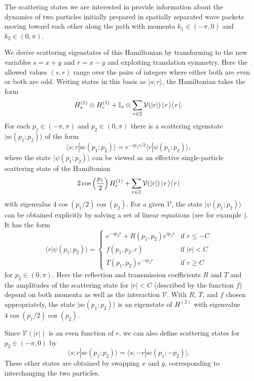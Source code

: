 \documentclass[../thesis-main/thesis-main]{subfiles}
\begin{document}
The scattering states we are interested in provide information about the dynamics of two particles initially prepared in spatially separated wave packets moving toward each other along the path with momenta $k_1\in(-\pi,0) $ and $k_2\in (0,\pi)$.

We derive scattering eigenstates of this Hamiltonian by transforming to the new variables $s = x+y$ and $r = x-y$ and exploiting translation symmetry.  Here the allowed values $(s,r)$ range over the pairs of integers where either both are even or both are odd.  Writing states in this basis as $|s;r\rangle$, the Hamiltonian takes the form
\begin{equation}
  H^{(1)}_s\otimes H^{(1)}_r+ \mathbb{I}_s\otimes \sum_{r\in \mathbb{Z}} \mathcal{V}(|r|) \, |\mspace{2mu} r \mspace{2mu} \rangle\langle\mspace{2mu} r \mspace{2mu} |.
\label{eq:twopart_ham}
\end{equation}
For each $p_1\in (-\pi,\pi)$ and $p_2\in(0,\pi)$ there is a scattering eigenstate $|\mathrm{sc}(p_1;p_2)\rangle$ of the form
\[
\langle s;r |\mathrm{sc}(p_1;p_2)\rangle=e^{-ip_1 s/2} \langle r|\psi(p_1;p_2)\rangle,
\]
where the state $|\psi(p_1;p_2)\rangle$ can be viewed as an effective single-particle scattering state of the Hamiltonian
\begin{equation}
 2\cos\left(\frac{p_1}{2}\right) H^{(1)}_r + \sum_{r\in \mathbb{Z}} \mathcal{V}(|r|) \, |\mspace{2mu} r \mspace{2mu} \rangle\langle\mspace{2mu} r \mspace{2mu} |\label{eq:vr_eqn}
\end{equation}
with eigenvalue $4 \cos( p_1/2) \cos(p_2)$.  For a given $\mathcal{V}$, the state $|\psi(p_1;p_2)\rangle$ can be obtained explicitly by solving a set of linear equations (see for example \cite{Childs_Gosset}). It has the form
\begin{equation}
\langle r|\psi (p_1;p_2)\rangle= \begin{cases}  e^{-i p_2 r} + R(p_1,p_2) e^{i p_2 r} &  \text{if } r \leq -C\\
  	f(p_1,p_2,r) &  \text{if } |r| < C\\
  	T(p_1,p_2) e^{- i p_2 r}  & \text{if } r \geq C\end{cases}
\label{eq:psip1p2}
\end{equation}
for $p_2\in (0,\pi)$. Here the reflection and transmission coefficients $R$ and $T$ and the amplitudes of the scattering state for $|r|<C$ (described by the function $f$) depend on both momenta as well as the interaction $\mathcal{V}$.  With $R$, $T$, and $f$ chosen appropriately, the state $|\mathrm{sc}(p_1;p_2)\rangle$ is an eigenstate of $H^{(2)}$ with eigenvalue $4\cos(p_1/2)\cos(p_2)$.

Since $\mathcal{V}(|r|)$ is an even function of $r$, we can also define scattering states for $p_2\in (-\pi,0)$ by
\[
\langle s;r|\mathrm{sc}(p_1;p_2)\rangle=\langle s;-r|\mathrm{sc}(p_1;-p_2)\rangle.
\]
These other states are obtained by swapping $x$ and $y$, corresponding to interchanging the two particles.
\end{document}
